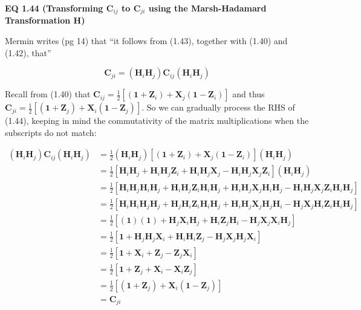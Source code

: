 \documentclass{article}
\begin{document}
\vspace{0.125in}


\vspace{0.25in}

\textbf{EQ 1.44 (Transforming $\bm{C}_{ij}$ to $\bm{C}_{ji}$ using the Marsh-Hadamard Transformation $\bm{H}$)}\par

\vspace{0.25in}

Mermin writes (pg 14) that ``it follows from (1.43), together with (1.40) and (1.42), that''

\[\tag{1.44}
\bm{C}_{ji} = (\bm{H}_i\bm{H}_j)\bm{C}_{ij}(\bm{H}_i\bm{H}_j)
\]

Recall from (1.40) that $\bm{C}_{ij} = \frac{1}{2}[(\bm{1} + \bm{Z}_i) + \bm{X}_j(\bm{1} - \bm{Z}_i)]$ and thus $\bm{C}_{ji} = \frac{1}{2}[(\bm{1} + \bm{Z}_j) + \bm{X}_i(\bm{1} - \bm{Z}_j)]$. So we can gradually process the RHS of (1.44), keeping in mind the commutativity of the matrix multiplications when the subscripts do not match:

\begin{align*}
(\bm{H}_i\bm{H}_j)\bm{C}_{ij}(\bm{H}_i\bm{H}_j)
&= \frac{1}{2}(\bm{H}_i\bm{H}_j)[(\bm{1} + \bm{Z}_i) + \bm{X}_j(\bm{1} - \bm{Z}_i)](\bm{H}_i\bm{H}_j)\\
&= \frac{1}{2}[\bm{H}_i\bm{H}_j + \bm{H}_i\bm{H}_j\bm{Z}_i + \bm{H}_i\bm{H}_j\bm{X}_j - \bm{H}_i\bm{H}_j\bm{X}_j\bm{Z}_i](\bm{H}_i\bm{H}_j)\\
&= \frac{1}{2}[\bm{H}_i\bm{H}_j\bm{H}_i\bm{H}_j + \bm{H}_i\bm{H}_j\bm{Z}_i\bm{H}_i\bm{H}_j + \bm{H}_i\bm{H}_j\bm{X}_j\bm{H}_i\bm{H}_j - \bm{H}_i\bm{H}_j\bm{X}_j\bm{Z}_i\bm{H}_i\bm{H}_j]\\
&=\tag{commuting} \frac{1}{2}[\bm{H}_i\bm{H}_i\bm{H}_j\bm{H}_j
+ \bm{H}_j\bm{H}_i\bm{Z}_i\bm{H}_i\bm{H}_j
+ \bm{H}_i\bm{H}_j\bm{X}_j\bm{H}_j\bm{H}_i
- \bm{H}_j\bm{X}_j\bm{H}_i\bm{Z}_i\bm{H}_i\bm{H}_j]\\
&=\tag{simplifying using (1.42) and (1.43)} \frac{1}{2}[(\bm{1})(\bm{1})
+ \bm{H}_j\bm{X}_i\bm{H}_j
+ \bm{H}_i\bm{Z}_j\bm{H}_i
- \bm{H}_j\bm{X}_j\bm{X}_i\bm{H}_j]\\
&=\tag{commuting} \frac{1}{2}[\bm{1}
+ \bm{H}_j\bm{H}_j\bm{X}_i
+ \bm{H}_i\bm{H}_i\bm{Z}_j
- \bm{H}_j\bm{X}_j\bm{H}_j\bm{X}_i]\\
&=\tag{simplifying using (1.42) and (1.43)} \frac{1}{2}[\bm{1}
+ \bm{X}_i
+ \bm{Z}_j
- \bm{Z}_j\bm{X}_i]\\
&=\tag{commuting} \frac{1}{2}[\bm{1}
+ \bm{Z}_j
+ \bm{X}_i
- \bm{X}_i\bm{Z}_j]\\
&=\tag{factoring} \frac{1}{2}[(\bm{1} + \bm{Z}_j)
+ \bm{X}_i (\bm{1} - \bm{Z}_j)]\\
&= \bm{C}_{ji}
\end{align*}
\end{document}

